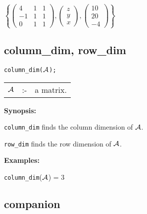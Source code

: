 \vspace*{0.1in}

\begin{flushleft}
\hspace*{0.175in}
\begin{math}
\left\{ \left( \begin{array}{ccc} 4 & 1 & 1 \\ -1 & 1 & 1 \\ 0 & 1 & 1
\end{array} \right), \left( \begin{array}{c} z \\ y \\ x \end{array}
\right), \left( \begin{array}{c} 10 \\ 20 \\ -4
\end{array} \right) \right\}
\end{math}
\end{flushleft}

\subsection{column\_dim, row\_dim}


\hspace*{0.175in} {\tt column\_dim(${\cal A}$);}

\hspace*{0.1in}
\begin{tabular}{l l l}
${\cal A}$ &:-& a matrix.
\end{tabular}

{\bf Synopsis:} %

\hspace*{0.175in} {\tt column\_dim} finds the column dimension of
                ${\cal A}$.

\hspace*{0.175in} {\tt row\_dim} finds the row dimension of ${\cal A}$.

{\bf Examples:}

\hspace*{0.175in}
{\tt column\_dim}(${\cal A}$) = 3

\subsection{companion}

